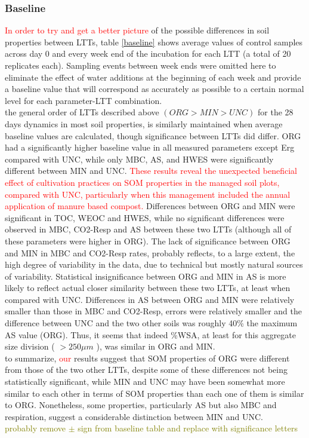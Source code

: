 \documentclass[12pt]{report}
\newcommand{\myRed}[1]{\textcolor{red}{#1}} %
\newcommand{\myGreen}[1]{\textcolor{olive}{#1}} %
\begin{document}
	\subsubsection{Baseline}
		\myRed{In order to try and get a better picture} of the possible differences in soil properties between LTTs,  table \ref{baseline} shows average values of control samples across day 0 and every week end of the incubation for each LTT (a total of 20 replicates each). Sampling events between week ends were omitted here to eliminate the effect of water additions at the beginning of each week and provide a baseline value that will correspond as accurately as possible to a certain normal level for each parameter-LTT combination.\\
		the general order of LTTs described above $\left(ORG > MIN > UNC\right)$ for the 28 days dynamics in most soil properties, is similarly maintained when average baseline values are calculated, though significance between LTTs did differ.
		ORG had a significantly higher baseline value in all measured parameters except Erg compared with UNC, while only MBC, AS, and HWES were significantly different between MIN and UNC. \myRed{These results reveal the unexpected beneficial effect of cultivation practices on SOM properties in the managed soil plots, compared with UNC, particularly when this management included the annual application of manure based compost.} 
		Differences between ORG and MIN were significant in TOC, WEOC and HWES, while no significant differences were observed in MBC, CO2-Resp and AS between these two LTTs (although all of these parameters were higher in ORG). 
		The lack of significance between ORG and MIN in MBC and CO2-Resp rates, probably reflects, to a large extent, the high degree of variability in the data, due to technical but mostly natural sources of variability.  Statistical insignificance between ORG and MIN in AS is more likely to reflect actual closer similarity between these two LTTs, at least when compared with UNC. Differences in AS between ORG and MIN were relatively smaller than those in MBC and CO2-Resp, errors were relatively smaller and the difference between UNC and the two other soils was roughly 40\% the maximum AS value (ORG). Thus, it seems that indeed \%WSA, at least for this aggregate size division ( $ >250\mu m$ ), was similar in ORG and MIN.\\
		to summarize, \myRed{our} results suggest that SOM properties of ORG were different from those of the two other LTTs, despite some of these differences not being statistically significant, while MIN and UNC may have been somewhat more similar to each other in terms of SOM properties than each one of them is similar to ORG. Nonetheless, some properties, particularly AS but also MBC and respiration, suggest a considerable distinction between MIN and UNC. \\
		\myGreen{probably remove $ \pm $ sign from baseline table and replace with significance letters}
		
\end{document}
